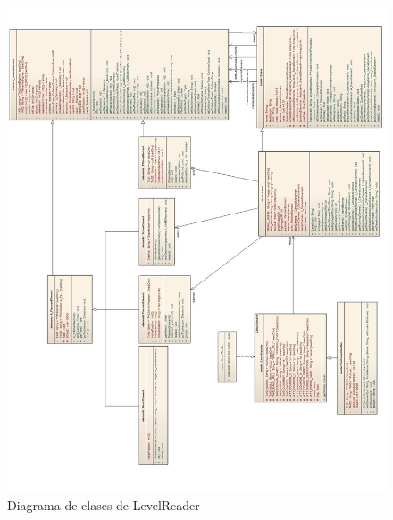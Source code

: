 \begin{figure}[ch!]
\centering
\includegraphics[width=15cm]{img/uml/LevelReader.jpg}	
\caption{Diagrama de clases de LevelReader}
\end{figure}

